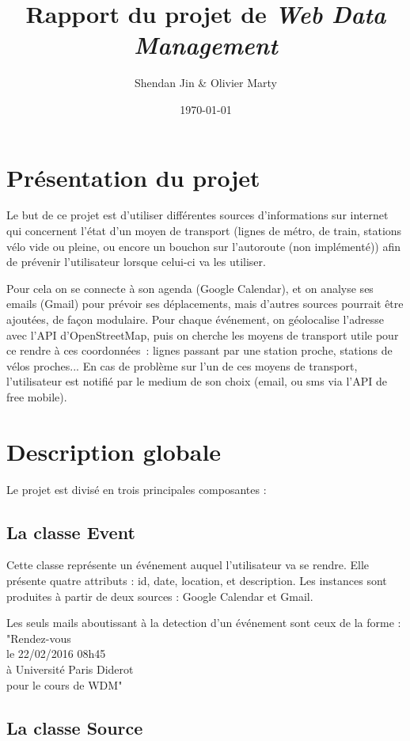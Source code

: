 \documentclass[a4paper, 8pt]{article}
\title{\vspace{-2cm}Rapport du projet de \emph{Web Data Management}}
\author{Shendan Jin \& Olivier Marty}
\date\today
\begin{document}
\maketitle

\section{Présentation du projet}

Le but de ce projet est d'utiliser différentes sources d'informations sur
internet qui concernent l'état d'un moyen de transport (lignes de
métro, de train, stations vélo vide ou pleine, ou encore un bouchon sur
l'autoroute (non implémenté)) afin de prévenir l'utilisateur lorsque celui-ci va
les utiliser.

Pour cela on se connecte à son agenda (Google Calendar), et on analyse ses emails
(Gmail) pour prévoir ses déplacements, mais d'autres sources pourrait être
ajoutées, de façon modulaire.
Pour chaque événement, on géolocalise l'adresse avec l'API d'OpenStreetMap,
puis on cherche les moyens de transport utile pour ce rendre à ces coordonnées~:
lignes passant par une station proche, stations de vélos proches...
En cas de problème sur l'un de ces moyens de transport, l'utilisateur est
notifié par le medium de son choix (email, ou sms via l'API de free mobile).

\section{Description globale}

Le projet est divisé en trois principales composantes :

\subsection{La classe Event}

Cette classe représente un événement auquel l'utilisateur va se rendre.
Elle présente quatre attributs : id, date, location, et description.
Les instances sont produites à partir de deux sources : Google Calendar et
Gmail.

Les seuls mails aboutissant à la detection d'un événement sont ceux de la forme :\\
"Rendez-vous\\
le 22/02/2016 08h45\\
à Université Paris Diderot\\
pour le cours de WDM"


\subsection{La classe Source}
\end{document}
